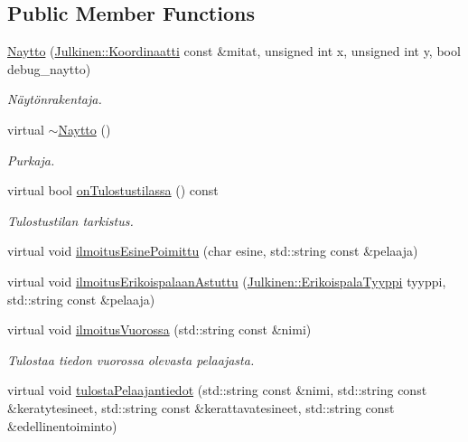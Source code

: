 \subsection*{Public Member Functions}
\begin{DoxyCompactItemize}
\item 
\hyperlink{class_naytto_a10c88b8375ec0c4b88e55eb8005f1c9a}{Naytto} (\hyperlink{class_julkinen_1_1_koordinaatti}{Julkinen\+::\+Koordinaatti} const \&mitat, unsigned int x, unsigned int y, bool debug\+\_\+naytto)
\begin{DoxyCompactList}\small\item\em Näytönrakentaja. \end{DoxyCompactList}\item 
virtual \hyperlink{class_naytto_ac67aeac64dacc24f045210ab0b958768}{$\sim$\+Naytto} ()
\begin{DoxyCompactList}\small\item\em Purkaja. \end{DoxyCompactList}\item 
virtual bool \hyperlink{class_naytto_a1be5a43b84f00c279e6e8f619d613de9}{on\+Tulostustilassa} () const 
\begin{DoxyCompactList}\small\item\em Tulostustilan tarkistus. \end{DoxyCompactList}\item 
virtual void \hyperlink{class_naytto_a1ad6d3eea578c82c6260bc59d04e17a1}{ilmoitus\+Esine\+Poimittu} (char esine, std\+::string const \&pelaaja)
\item 
virtual void \hyperlink{class_naytto_ae8f3bdaee4c802e33be17b0efb50a530}{ilmoitus\+Erikoispalaan\+Astuttu} (\hyperlink{namespace_julkinen_afc26052e09d0b2214f749492cc5fff19}{Julkinen\+::\+Erikoispala\+Tyyppi} tyyppi, std\+::string const \&pelaaja)
\item 
virtual void \hyperlink{class_naytto_aebc53e0348c5f5ba88424a0e2a39991d}{ilmoitus\+Vuorossa} (std\+::string const \&nimi)
\begin{DoxyCompactList}\small\item\em Tulostaa tiedon vuorossa olevasta pelaajasta. \end{DoxyCompactList}\item 
virtual void \hyperlink{class_naytto_ababf9b69de2295fe4eaccc3d95461943}{tulosta\+Pelaajantiedot} (std\+::string const \&nimi, std\+::string const \&keratytesineet, std\+::string const \&kerattavatesineet, std\+::string const \&edellinentoiminto)
\item 

\end{DoxyCompactItemize}
